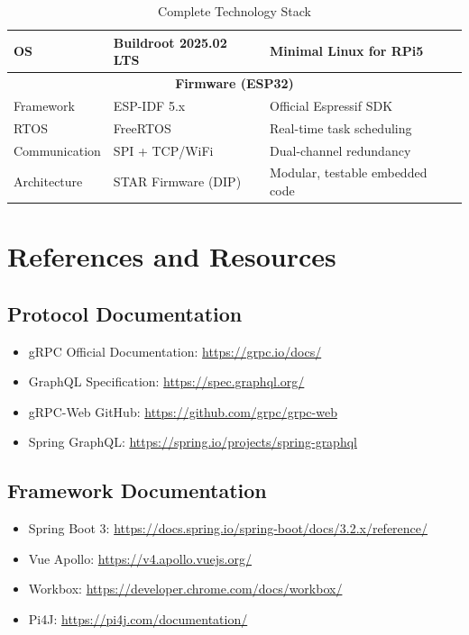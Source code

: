 \documentclass[11pt,letterpaper]{article}
\begin{document}
\begin{table}[H]
\begin{tabularx}{\textwidth}{|l|l|X|}
OS & Buildroot 2025.02 LTS & Minimal Linux for RPi5 \\
\hline
\multicolumn{3}{|c|}{\textbf{Firmware (ESP32)}} \\
\hline
Framework & ESP-IDF 5.x & Official Espressif SDK \\
RTOS & FreeRTOS & Real-time task scheduling \\
Communication & SPI + TCP/WiFi & Dual-channel redundancy \\
Architecture & STAR Firmware (DIP) & Modular, testable embedded code \\
\hline
\end{tabularx}
\caption{Complete Technology Stack}
\end{table}

\section{References and Resources}

\subsection{Protocol Documentation}
\begin{itemize}
    \item gRPC Official Documentation: \url{https://grpc.io/docs/}
    \item GraphQL Specification: \url{https://spec.graphql.org/}
    \item gRPC-Web GitHub: \url{https://github.com/grpc/grpc-web}
    \item Spring GraphQL: \url{https://spring.io/projects/spring-graphql}
\end{itemize}

\subsection{Framework Documentation}
\begin{itemize}
    \item Spring Boot 3: \url{https://docs.spring.io/spring-boot/docs/3.2.x/reference/}
    \item Vue Apollo: \url{https://v4.apollo.vuejs.org/}
    \item Workbox: \url{https://developer.chrome.com/docs/workbox/}
    \item Pi4J: \url{https://pi4j.com/documentation/}
\end{itemize}
\end{document}

